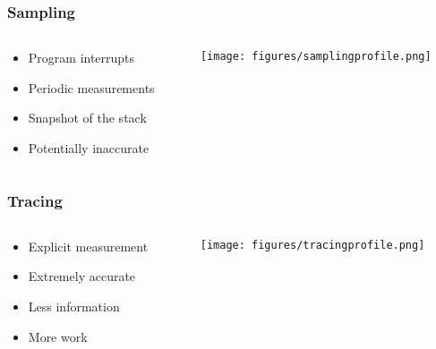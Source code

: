 \documentclass[dvipsnames,presentation,aspectratio=169,14pt]{beamer}
\begin{document}
\begin{frame}
  \frametitle{Sampling}
  \begin{columns}[c]
    \begin{column}{.4\textwidth}
      \begin{itemize}[leftmargin=10pt,itemsep=8pt]
      \item Program interrupts
      \item Periodic measurements
      \item Snapshot of the stack
      \item Potentially inaccurate
      \end{itemize}
    \end{column}
    \begin{column}{.55\textwidth}
      \begin{center}
        \texttt{[image: figures/samplingprofile.png]}
      \end{center}
    \end{column}
  \end{columns}
\end{frame}

\begin{frame}
  \frametitle{Tracing}
  \begin{columns}[c]
    \begin{column}{.4\textwidth}
      \begin{itemize}[leftmargin=10pt,itemsep=8pt]
      \item Explicit measurement
      \item Extremely accurate
      \item Less information
      \item More work
      \end{itemize}
    \end{column}
    \begin{column}{.55\textwidth}
      \begin{center}
        \texttt{[image: figures/tracingprofile.png]}
      \end{center}
    \end{column}
  \end{columns}
\end{frame}
\end{document}
